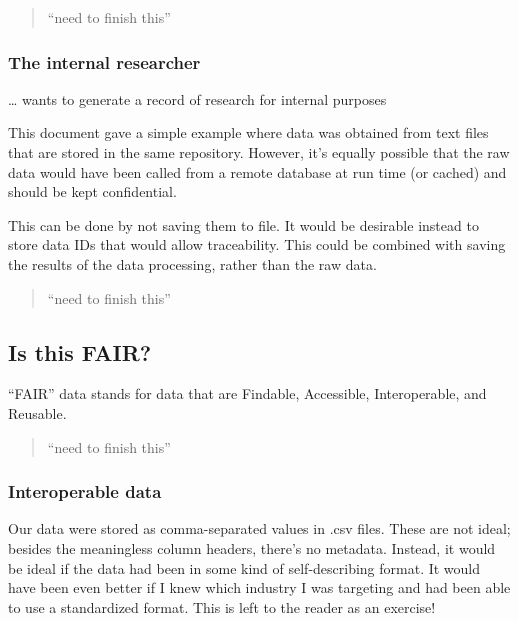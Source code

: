 \documentclass[11pt,]{article}
\begin{document}
\begin{quote}
``need to finish this''
\end{quote}

\hypertarget{the-internal-researcher}{%
\subsubsection{The internal researcher}\label{the-internal-researcher}}

\ldots{} wants to generate a record of research for internal purposes

This document gave a simple example where data was obtained from text files that are stored in the same repository. However, it's equally possible that the raw data would have been called from a remote database at run time (or cached) and should be kept confidential.

This can be done by not saving them to file. It would be desirable instead to store data IDs that would allow traceability. This could be combined with saving the results of the data processing, rather than the raw data.

\begin{quote}
``need to finish this''
\end{quote}

\hypertarget{is-this-fair}{%
\subsection{Is this FAIR?}\label{is-this-fair}}

``FAIR'' data stands for data that are Findable, Accessible, Interoperable, and Reusable.

\begin{quote}
``need to finish this''
\end{quote}

\hypertarget{interoperable-data}{%
\subsubsection{Interoperable data}\label{interoperable-data}}

Our data were stored as comma-separated values in .csv files. These are not ideal; besides the meaningless column headers, there's no metadata. Instead, it would be ideal if the data had been in some kind of self-describing format. It would have been even better if I knew which industry I was targeting and had been able to use a standardized format. This is left to the reader as an exercise!
\end{document}
